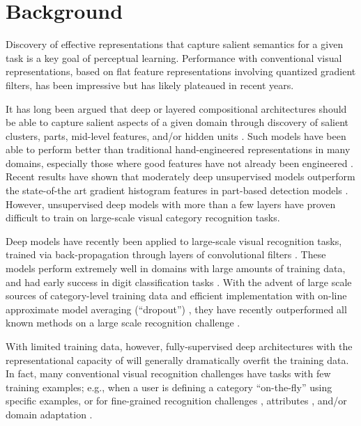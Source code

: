 
\section{Background}
Discovery of effective representations that capture salient semantics
for a given task is a key goal of perceptual learning.  Performance
with conventional visual representations, based on flat feature
representations involving quantized gradient filters, has been
impressive but has likely plateaued in recent years.

It has long been argued that deep or layered compositional
architectures should be able to capture salient aspects of a given
domain through discovery of salient clusters, parts, mid-level
features, and/or hidden units
\cite{autoencoders,fidler,yuille2007,efros2012,krizhevsky2012imagenet}. Such models have
been able to perform better than traditional hand-engineered
representations in many domains, especially those where good features
have not already been engineered \cite{ngunsupervised}.  Recent
results have shown that moderately deep unsupervised models outperform
the state-of-the art gradient histogram features in part-based
detection models \cite{hsc}. However, unsupervised deep models with
more than a few layers have proven difficult to train on large-scale visual category recognition tasks.

Deep models have recently been applied to large-scale
visual recognition tasks, trained via back-propagation through layers of convolutional filters
\cite{lecun89}. These models perform extremely well in domains with
large amounts of training data, and had early success in digit
classification tasks \cite{lecun1998gradient}. With the advent of large scale
sources of category-level training data and
efficient implementation with on-line approximate model averaging
(``dropout'') \cite{krizhevsky2012imagenet}, they have recently outperformed all
known methods on a large scale recognition challenge
\cite{ilsvrc2012}.


With limited training data, however, fully-supervised deep
architectures with the representational capacity of \cite{krizhevsky2012imagenet}
will generally dramatically overfit the training data.
In fact, many conventional visual recognition challenges have tasks with few
training examples; e.g., when a user is defining a category
``on-the-fly'' using specific examples, or for fine-grained
recognition challenges \cite{birds}, attributes \cite{attribute}, and/or
domain adaptation \cite{saenko2010adapting}.

